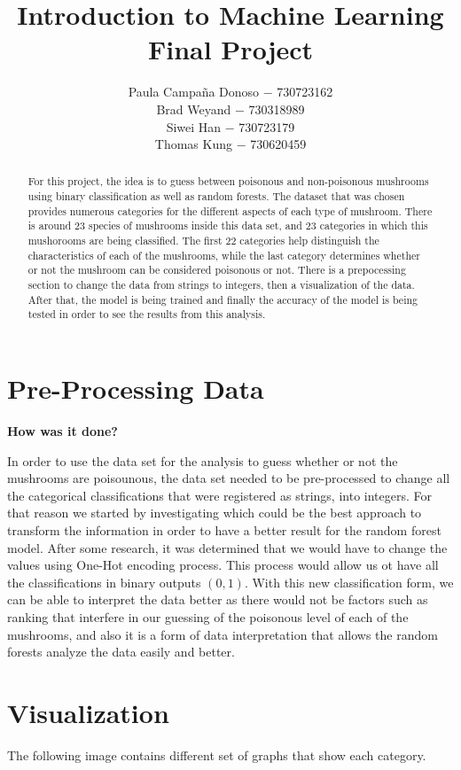 \documentclass[]{article}
\title{Introduction to Machine Learning Final Project}
\author{Paula Campaña Donoso $-$ 730723162 \\ Brad Weyand $-$ 730318989 \\ Siwei Han $-$ 730723179 \\ Thomas Kung $-$ 730620459}
\begin{document}
\maketitle

\begin{abstract}
For this project, the idea is to guess between poisonous and non-poisonous mushrooms using binary classification as well as random forests. The dataset that was chosen provides numerous categories for the different aspects of each type of mushroom. There is around 23 species of mushrooms inside this data set, and 23 categories in which this mushorooms are being classified. The first 22 categories help distinguish the characteristics of each of the mushrooms, while the last category determines whether or not the mushroom can be considered poisonous or not. There is a prepocessing section to change the data from strings to integers, then a visualization of the data. After that, the model is being trained and finally the accuracy of the model is being tested in order to see the results from this analysis.
\end{abstract}

\section{Pre-Processing Data}

\textbf{How was it done?}
\medskip

In order to use the data set for the analysis to guess whether or not the mushrooms are poisounous, the data set needed to be pre-processed to change all the categorical classifications that were registered as strings, into integers. For that reason we started by investigating which could be the best approach to transform the information in order to have a better result for the random forest model. After some research, it was determined that we would have to change the values using One-Hot encoding process. This process would allow us ot have all the classifications in binary outputs $(0,1)$. With this new classification form, we can be able to interpret the data better as there would not be factors such as ranking that interfere in our guessing of the poisonous level of each of the mushrooms, and also it is a form of data interpretation that allows the random forests analyze the data easily and better.

\section{Visualization}
The following image contains different set of graphs that show each category.
\end{document}
